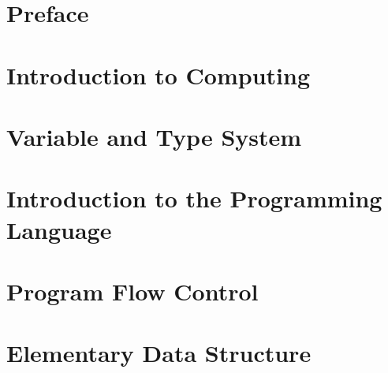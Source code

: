 \documentclass[11pt,titlepage]{book}
\begin{document}
\frontmatter

\tableofcontents
\chapter{Preface}
    
\mainmatter
\chapter{Introduction to Computing}
    
    
    
    
    
    
    
\chapter{Variable and Type System}
    
    
    
    
    
    
    
    
    
    
    
    
    
\chapter{Introduction to the \csharp Programming Language}
    
    
    
    
    
    
    
    
    
\chapter{Program Flow Control}
    
    
    
    
    
    
    
    
    
    
    
    
    
\chapter{Elementary Data Structure}
    
    
    
    
    
    
    
    
    
    
    
\end{document}
